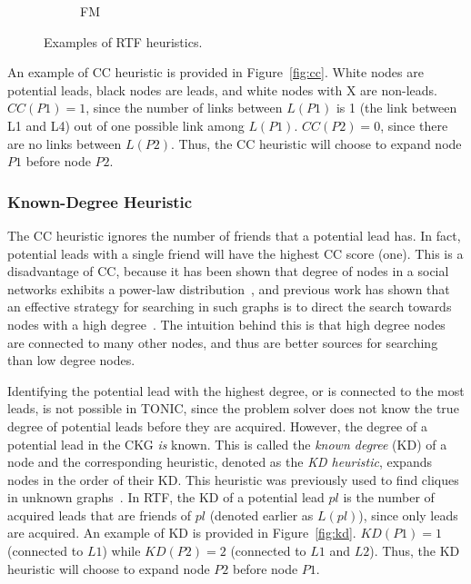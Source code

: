 \documentclass[prodmode,acmtecs]{acmsmall} %
\newcommand{\note}[2]{\textbf{\textsc{#1} says: \textit{#2}}}
\begin{document}
\begin{figure}
\begin{subfigure}{.19\textwidth}
   \caption{FM}\label{fig:fm_btf}
\end{subfigure}
\caption{Examples of RTF heuristics.} 
\end{figure}


An example of CC heuristic is provided in Figure~\ref{fig:cc}. White nodes are potential leads, black nodes are leads, and white nodes with X are non-leads.
$CC(P1)=1$, since the number of links between $L(P1)$ is 1 (the link between L1 and L4) out of one possible link among $L(P1)$.
$CC(P2)=0$, since there are no links between $L(P2)$. Thus, the CC  heuristic will choose to expand node $P1$ before node $P2$.

\subsubsection{Known-Degree Heuristic}
The CC heuristic ignores the number of friends that a potential lead has. In fact, potential leads with a single friend will have the highest CC score (one). This is a disadvantage of CC, because it has been shown that degree of nodes in a social networks exhibits a power-law distribution~\cite{barabasi1999emergence}, and previous work has shown that an effective strategy for searching in such graphs is to direct the search towards nodes with a high degree~\cite{adamic2001searchInPowerLaw}. 
The intuition behind this is that high degree nodes are connected to many other nodes, and thus are better sources for searching than low degree nodes.


Identifying the potential lead with the highest degree, or is connected to the most leads, is not possible in TONIC, since the problem solver does not know the true degree of potential leads before they are acquired. However, the degree of a potential lead in the CKG {\em is} known. This is called the {\em known degree} (KD) of a node and the corresponding heuristic, denoted as the {\em KD heuristic}, expands nodes in the order of their KD. This heuristic was previously used to find cliques in unknown graphs~\cite{stern2012findingPatterns}. In RTF, the KD of a potential lead $pl$ is the number of acquired leads that are friends of $pl$ (denoted earlier as $L(pl)$), since only leads are acquired. An example of KD is provided in Figure~\ref{fig:kd}.
$KD(P1)=1$ (connected to $L1$) while $KD(P2)=2$ (connected to $L1$ and $L2$). Thus, the KD  heuristic will choose to expand node $P2$ before node $P1$.
\end{document}

